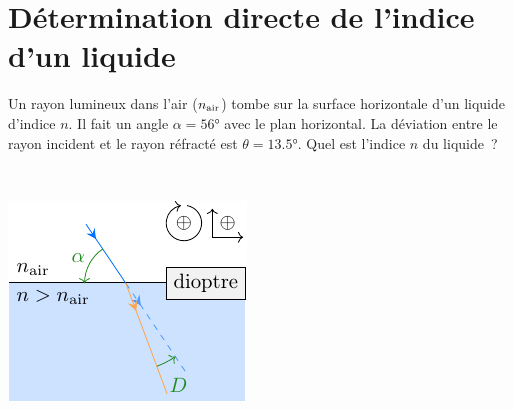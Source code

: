 \documentclass[../../main/main.tex]{subfiles}
\begin{document}
\section{Détermination directe de l'indice d'un liquide}
\noindent
\begin{minipage}[c]{.68\linewidth}
	Un rayon lumineux dans l'air ($n_{\rm air}$) tombe sur la surface horizontale
	d'un liquide d'indice $n$. Il fait un angle $\alpha = \ang{56;;}$ avec le plan
	horizontal. La déviation entre le rayon incident et le rayon réfracté est
	$\theta = \ang{13.5;;}$. Quel est l'indice $n$ du liquide~?
\end{minipage}
\hfill
\begin{minipage}[c]{.3\linewidth}
	~
	\begin{center}
		\includegraphics[width=\linewidth]{dioptre_alpha-horiz_plain}
		\label{fig:alpha_horiz}
	\end{center}
\end{minipage}
\end{document}
